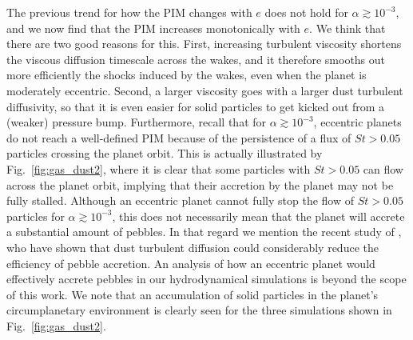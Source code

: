 \documentclass[fleqn,usenatbib]{mnras}
\begin{document}
The previous trend for how the PIM changes with $e$ does not hold for $\alpha \gtrsim 10^{-3}$, and we now find that the PIM increases monotonically with $e$. We think that there are two good reasons for this. First, increasing turbulent viscosity shortens the viscous diffusion timescale across the wakes, and it therefore smooths out more efficiently the shocks induced by the wakes, even when the planet is moderately eccentric. Second, a larger viscosity goes with a larger dust turbulent diffusivity, so that it is even easier for solid particles to get kicked out from a (weaker) pressure bump. Furthermore, recall that for $\alpha \gtrsim 10^{-3}$, eccentric planets do not reach a well-defined PIM because of the persistence of a flux of $St > 0.05$ particles crossing the planet orbit. This is actually illustrated by Fig.~\ref{fig:gas_dust2}, where it is clear that some particles with $St > 0.05$ can flow across the planet orbit, implying that their accretion by the planet may not be fully stalled. Although an eccentric planet cannot fully stop the flow of $St>0.05$ particles for $\alpha \gtrsim 10^{-3}$, this does not necessarily mean that the planet will accrete a substantial amount of pebbles. In that regard we mention the recent study of \citet{LO2018}, who have shown that dust turbulent diffusion could considerably reduce the efficiency of pebble accretion. An analysis of how an eccentric planet would effectively accrete pebbles in our hydrodynamical simulations is beyond the scope of this work. We note that an accumulation of solid particles in the planet's circumplanetary environment is clearly seen for the three simulations shown in Fig.~\ref{fig:gas_dust2}.
\end{document}
